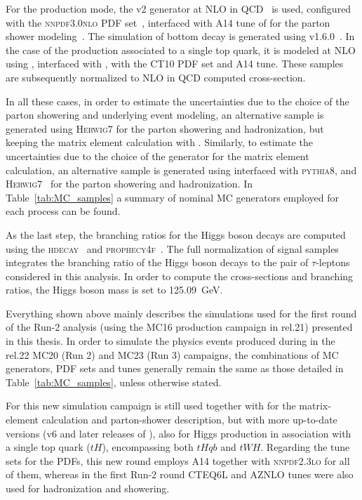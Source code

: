 For the \tth production mode, the \powhegbox v2 generator at NLO in QCD~\cite{frixione2015,Zhang_2014,Dawson_2003,Beenakker_2003} is used, configured with the \textsc{nnpdf3.0nlo} PDF set~\cite{Martin_2009}, interfaced with A14 tune of  for the parton shower modeling~\cite{A14}. The simulation of bottom decay is generated using \evtgen v1.6.0~\cite{LANGE2001152}.
In the case of the production associated to a single top quark, it is modeled at NLO using \madgraph, interfaced with , with the \textsc{CT10} PDF set and A14 tune. These samples are subsequently normalized to NLO in QCD computed cross-section.

In all these cases, in order to estimate the uncertainties due to the choice of the parton showering and underlying event modeling, an alternative sample is generated using \textsc{Herwig7} for the parton showering and hadronization, 
but keeping the matrix element calculation with \powheg. Similarly, to estimate the uncertainties due to the choice of the generator for the matrix element calculation,
an alternative sample is generated using \madgraph interfaced with \textsc{pythia8}, and \textsc{Herwig7}~\cite{bellm2017herwig71releasenote} for the parton showering and hadronization.
In Table~\ref{tab:MC_samples} a summary of nominal MC generators employed for each process can be found.

As the last step, the branching ratios for the Higgs boson decays are computed using the \textsc{hdecay}~\cite{Djouadi:1997yw,Spira:1997dg,Djouadi:2006bz} and \textsc{prophecy4f}~\cite{Bredenstein:2006ha,Bredenstein:2006rh,Bredenstein:2006nk}.
The full normalization of signal samples integrates the branching ratio of the Higgs boson decays to the pair of $\tau$-leptons considered in this analysis. In order to compute the cross-sections and branching ratios, the Higgs boson mass is set to 125.09~GeV.

Everything shown above mainly describes the simulations used for the first round of the Run-2 analysis (using the MC16 production campaign in rel.21) presented in this thesis. In order to simulate the physics events produced during in the rel.22 MC20 (Run 2) and MC23 (Run 3) campaigns,
the combinations of MC generators, PDF sets and tunes generally remain the same as those detailed in Table~\ref{tab:MC_samples}, unless otherwise stated.

For this new simulation campaign \powheg is still used together with \pythia for the matrix-element calculation and parton-shower description, but with more up-to-date versions (v6 and later releases of ), also for Higgs production in association with a single top quark ($tH$), encompassing both $tHqb$ and $tWH$.
Regarding the tune sets for the PDFs, this new round employs A14 together with \textsc{nnpdf2.3lo} for all of them, whereas in the first Run-2 round \textsc{CTEQ6L} and \textsc{AZNLO} tunes were also used for hadronization and showering.

